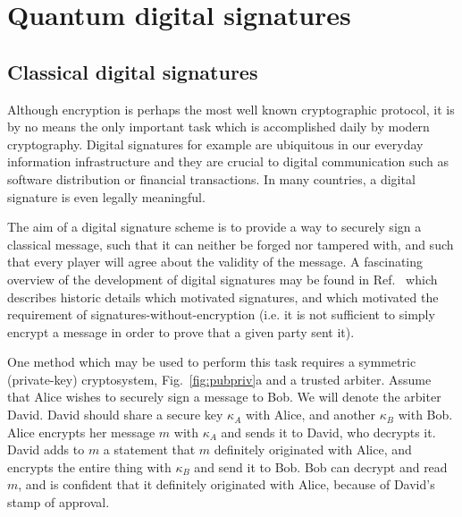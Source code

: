 \section{Quantum digital signatures}


\subsection{Classical digital signatures}

Although encryption is perhaps the most well known cryptographic protocol, it is by no means the only important task which is accomplished daily by modern cryptography. Digital signatures for example are ubiquitous in our everyday information infrastructure and they are crucial to digital communication such as software distribution or financial transactions. In many countries, a digital signature is even legally meaningful.

The aim of a digital signature scheme is to provide a way to securely sign a classical message, such that it can neither be forged nor tampered with, and such that every player will agree about the validity of the message. A fascinating overview of the development of digital signatures may be found in Ref.~\cite{Simmons1988} which describes historic details which motivated signatures, and which motivated the requirement of signatures-without-encryption (i.e. it is not sufficient to simply encrypt a message in order to prove that a given party sent it).

One method which may be used to perform this task requires a symmetric (private-key) cryptosystem, Fig.~\ref{fig:pubpriv}a and a trusted arbiter. Assume that Alice wishes to securely sign a message to Bob. We will denote the arbiter David. David should share a secure key $\kappa_A$ with Alice, and another $\kappa_B$ with Bob. Alice encrypts her message $m$ with $\kappa_A$ and sends it to David, who decrypts it. David adds to $m$ a statement that $m$ definitely originated with Alice, and encrypts the entire thing with $\kappa_B$ and send it to Bob. Bob can decrypt and read $m$, and is confident that it definitely originated with Alice, because of David's stamp of approval.

